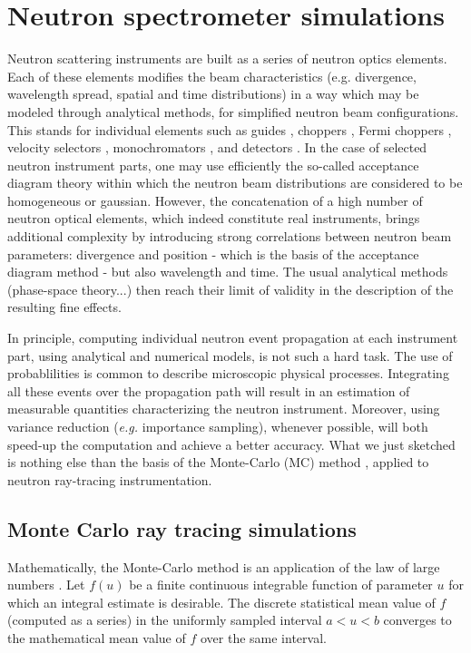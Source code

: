 \section{Neutron spectrometer simulations}

Neutron scattering instruments are built as a series of neutron optics elements. 
Each of these elements modifies the beam characteristics 
(e.g. divergence, wavelength spread, spatial and time distributions) 
in a way which may be modeled through analytical methods, 
for simplified neutron beam configurations.
This stands for individual elements such as guides \cite{Leibnitz63,Mildner90}, 
choppers \cite{Lowde60,Copley03}, Fermi choppers \cite{Fermi47,Peters05}, 
velocity selectors \cite{Clark66}, 
monochromators \cite{Freund83,Sears97,Shirane02,Alianelli04}, 
and detectors \cite{Radeka74,Charpak89,Manzin04}.
In the case of selected neutron instrument parts, one may use efficiently 
the so-called acceptance diagram theory \cite{Mildner90,Copley93,Cussen03} 
within which the neutron beam distributions are considered to be homogeneous 
or gaussian.
However, the concatenation of a high number of neutron optical elements, 
which indeed constitute real instruments, brings additional complexity 
by introducing strong correlations between neutron beam parameters: 
divergence and position - which is the basis of the acceptance diagram method - 
but also wavelength and time. 
The usual analytical methods (phase-space theory...) then reach their limit 
of validity in the description of the resulting fine effects.

In principle, computing individual neutron event propagation 
at each instrument part, using analytical and numerical models, 
is not such a hard task. 
The use of probablilities is common to describe microscopic physical processes. 
Integrating all these events over the propagation path will result 
in an estimation of measurable quantities characterizing the neutron instrument. 
Moreover, using variance reduction ({\it e.g.} importance sampling), 
whenever possible, will both speed-up the computation and achieve 
a better accuracy. What we just sketched is nothing else than the basis 
of the Monte-Carlo (MC) method \cite{James80}, 
applied to neutron ray-tracing instrumentation.

\subsection{Monte Carlo ray tracing simulations}
Mathematically, the Monte-Carlo method is an application of the law of large numbers \cite{James80,Grimmett92}. Let $f(u)$ be a finite continuous integrable function of parameter $u$ for which an integral estimate is desirable. The discrete statistical mean value of $f$ (computed as a series) in the uniformly sampled interval $a < u < b$ converges to the mathematical mean value of $f$ over the same interval.


